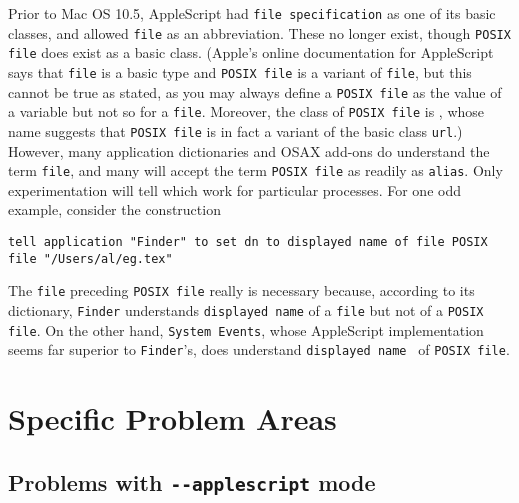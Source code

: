 \documentclass[11pt]{amsart}
\def\TeXShop{\TeX Shop\xspace}
\begin{document}
Prior to Mac OS 10.5, AppleScript had {\tt file specification} as one of its basic classes, and allowed {\tt file} as an abbreviation. These no longer exist, though {\tt POSIX file} does exist as a basic class. (Apple's online documentation for AppleScript says that {\tt file} is a basic type and {\tt POSIX file} is a variant of {\tt file}, but this cannot be true as stated, as you may always define a {\tt POSIX file} as the value of a variable but not so for a {\tt file}. Moreover, the class of {\tt POSIX file} is \guillemotright, whose name suggests that {\tt POSIX file} is in fact a variant of the basic class {\tt url}.) However, many application dictionaries and OSAX add-ons do understand the term {\tt file}, and many will accept the term {\tt POSIX file} as readily as {\tt alias}. Only experimentation will tell which work for particular processes. For one odd example, consider the construction
\begin{verbatim}
tell application "Finder" to set dn to displayed name of file POSIX file "/Users/al/eg.tex"
\end{verbatim}
The {\tt file} preceding {\tt POSIX file} really is necessary because, according to its dictionary, {\tt Finder} understands {\tt displayed name} of a {\tt file} but not of a {\tt POSIX file}. On the other hand, {\tt System Events}, whose AppleScript implementation seems far superior to {\tt Finder}'s, does understand {\tt displayed name } of {\tt POSIX file}.

\section{Specific Problem Areas}
\subsection{Problems with {\tt -{}-applescript} mode}
\end{document}
